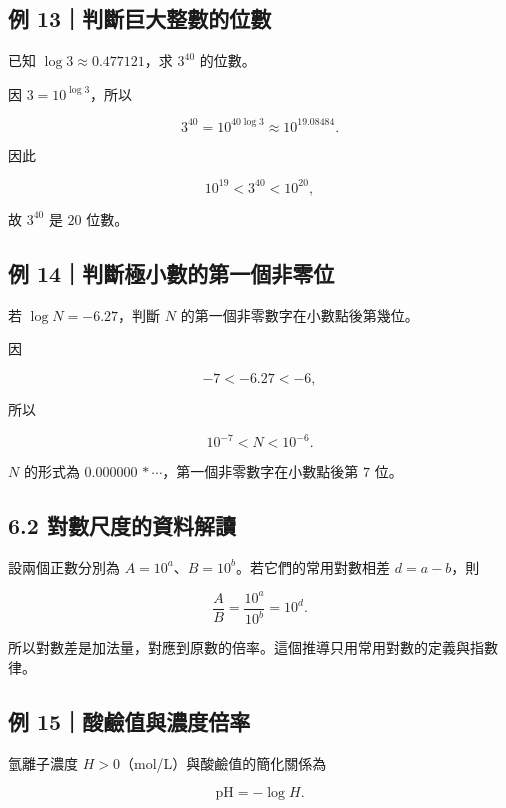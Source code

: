 \documentclass[11pt,a4paper]{article}
\begin{document}
\subsection{例 13｜判斷巨大整數的位數}\label{ux4f8b-13ux5224ux65b7ux5de8ux5927ux6574ux6578ux7684ux4f4dux6578}

已知 \(\log3\approx0.477121\)，求 \(3^{40}\) 的位數。

因 \(3=10^{\log3}\)，所以

\[
3^{40}=10^{40\log3}\approx10^{19.08484}.
\]

因此

\[
10^{19}<3^{40}<10^{20},
\]

故 \(3^{40}\) 是 \(\boxed{20\text{ 位數}}\)。

\subsection{例 14｜判斷極小數的第一個非零位}\label{ux4f8b-14ux5224ux65b7ux6975ux5c0fux6578ux7684ux7b2cux4e00ux500bux975eux96f6ux4f4d}

若 \(\log N=-6.27\)，判斷 \(N\) 的第一個非零數字在小數點後第幾位。

因

\[
-7<-6.27<-6,
\]

所以

\[
10^{-7}<N<10^{-6}.
\]

\(N\) 的形式為 \(0.000000\,*\cdots\)，第一個非零數字在小數點後第 \(\boxed7\) 位。

\subsection{6.2 對數尺度的資料解讀}\label{ux5c0dux6578ux5c3aux5ea6ux7684ux8cc7ux6599ux89e3ux8b80}

設兩個正數分別為 \(A=10^a\)、\(B=10^b\)。若它們的常用對數相差 \(d=a-b\)，則

\[
\frac AB=\frac{10^a}{10^b}=10^d.
\]

所以對數差是加法量，對應到原數的倍率。這個推導只用常用對數的定義與指數律。

\subsection{例 15｜酸鹼值與濃度倍率}\label{ux4f8b-15ux9178ux9e7cux503cux8207ux6fc3ux5ea6ux500dux7387}

氫離子濃度 \(H>0\)（mol/L）與酸鹼值的簡化關係為

\[
\mathrm{pH}=-\log H.
\]
\end{document}
